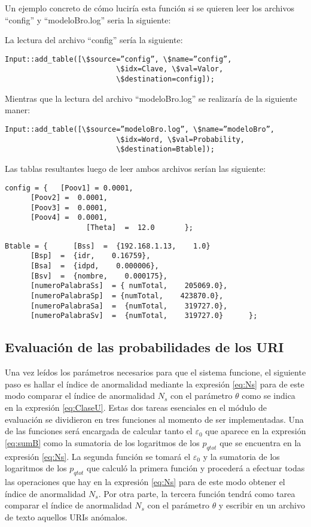 Un ejemplo concreto de cómo luciría esta función si se quieren leer los archivos “config” y “modeloBro.log” seria la siguiente:

La lectura del archivo “config” sería la siguiente:

\begin{verbatim}
Input::add_table([\$source=”config”, \$name=”config”,
                          \$idx=Clave, \$val=Valor,
                          \$destination=config]);
\end{verbatim}                    

Mientras que la lectura del archivo “modeloBro.log” se realizaría de la siguiente maner:

\begin{verbatim}
Input::add_table([\$source=”modeloBro.log”, \$name=”modeloBro”,
                          \$idx=Word, \$val=Probability,
                          \$destination=Btable]);
\end{verbatim}

Las tablas resultantes luego de leer ambos archivos serían las siguiente:

\begin{verbatim}
config = {   [Poov1] = 0.0001,
      [Poov2] =  0.0001,
      [Poov3] =  0.0001,
      [Poov4] =  0.0001,
                   [Theta]  =  12.0       };
\end{verbatim}

\begin{verbatim}
Btable = {      [Bss]  =  {192.168.1.13,    1.0}
      [Bsp]  =  {idr,    0.16759},
      [Bsa]  =  {idpd,    0.000006},
      [Bsv]  =  {nombre,    0.000175},
      [numeroPalabraSs]  = { numTotal,    205069.0},
      [numeroPalabraSp]  = {numTotal,    423870.0},
      [numeroPalabraSa]  =  {numTotal,    319727.0},
      [numeroPalabraSv]  =  {numTotal,    319727.0}      };
\end{verbatim}

\subsection{Evaluación de las probabilidades de los URI}

Una vez leídos los parámetros necesarios para que el sistema funcione, el siguiente paso es hallar el índice de anormalidad mediante la expresión \ref{eq:Ns} para de este modo comparar el índice de anormalidad $N_{s}$ con el parámetro $\theta$ como se indica en la expresión \ref{eq:ClaseU}. Estas dos tareas esenciales en el módulo de evaluación se dividieron en tres funciones al momento de ser implementadas. Una de las funciones será encargada de calcular tanto el $\varepsilon_{0}$ que aparece en la expresión \ref{eq:sumB} como la sumatoria de los logaritmos de los $p_{qtot}$ que se encuentra en la expresión \ref{eq:Ns}. La segunda función se tomará el $\varepsilon_{0}$ y la sumatoria de los logaritmos de los $p_{qtot}$ que calculó la primera función y procederá a efectuar todas las operaciones que hay en la expresión \ref{eq:Ns} para de este modo obtener el índice de anormalidad $N_{s}$. Por otra parte, la tercera función tendrá como tarea comparar el índice de anormalidad $N_{s}$ con el parámetro $\theta$ y escribir en un archivo de texto aquellos URIs anómalos.

